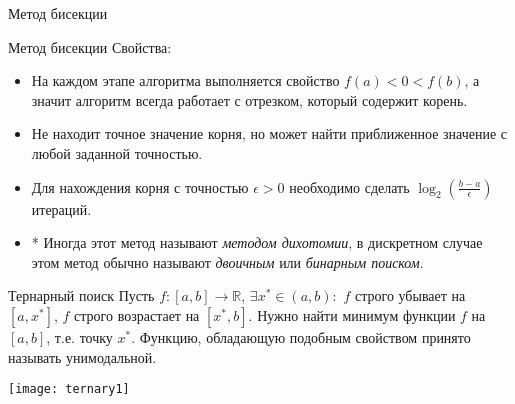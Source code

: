 \documentclass[10pt]{beamer}
\begin{document}
\begin{frame}{Метод бисекции}
\end{frame}

\begin{frame}{Метод бисекции}
Свойства:
\begin{itemize}
\item На каждом этапе алгоритма выполняется свойство $f(a)<0<f(b)$, а значит алгоритм всегда работает с отрезком, который содержит корень.
\item Не находит точное значение корня, но может найти приближенное значение с любой заданной точностью.
\item Для нахождения корня с точностью $\epsilon>0$ необходимо сделать $\log_2\left(\frac{b-a}{\epsilon}\right)$ итераций.
\item * Иногда этот метод называют \textit{методом дихотомии}, в дискретном случае этом метод обычно называют \textit{двоичным} или \textit{бинарным поиском}.
\end{itemize}
\end{frame}

\begin{frame}{Тернарный поиск}
Пусть $f:[a,b]\rightarrow\mathbb{R}$, $\exists x^*\in (a, b):$ $f$ строго убывает на $[a, x^*]$, $f$ строго возрастает на $[x^*, b]$. Нужно найти минимум функции $f$ на $[a, b]$, т.е. точку $x^*$. Функцию, обладающую подобным свойством принято называть унимодальной.

\begin{center}
\texttt{[image: ternary1]}
\end{center}

\end{frame}
\end{document}
